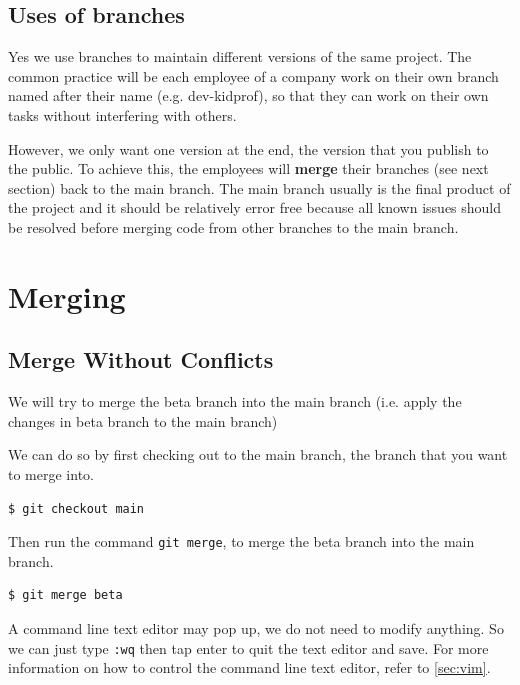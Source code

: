 \subsection*{Uses of branches}
Yes we use branches to maintain different versions of the same project. The common practice will be each employee of a company work on their own branch named after their name (e.g. dev-kidprof), so that they can work on their own tasks without interfering with others.

However, we only want one version at the end, the version that you publish to the public. To achieve this, the employees will \textbf{merge} their branches (see next section) back to the main branch. The main branch usually is the final product of the project and it should be relatively error free because all known issues should be resolved before merging code from other branches to the main branch.

\section{Merging}
\label{sec:merge}

\subsection{Merge Without Conflicts}

We will try to merge the beta branch into the main branch (i.e. apply the changes in beta branch to the main branch)

We can do so by first checking out to the main branch, the branch that you want to merge into.
\vspace{6mm}

\begin{lstlisting}[language=bash]
$ git checkout main
\end{lstlisting}

\vspace{6mm}
Then run the command \texttt{git merge}, to merge the beta branch into the main branch.

\vspace{6mm}\begin{lstlisting}[language=bash]
$ git merge beta
\end{lstlisting}
\vspace{6mm}

A command line text editor may pop up, we do not need to modify anything. So we can just type \texttt{:wq} then tap enter to quit the text editor and save. For more information on how to control the command line text editor, refer to \cref{sec:vim}.

